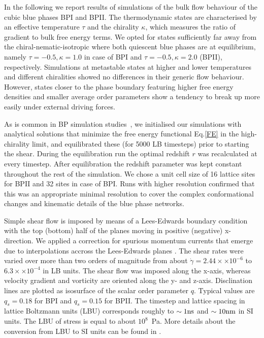\documentclass[aps,pre,reprint,superscriptaddress]{revtex4}
\newcommand{\e}[1]{\times10^{#1}}
\newcommand{\gd}{\dot{\gamma}}
\begin{document}
In the following we report results of simulations of the bulk flow behaviour of the cubic blue 
phases BPI and BPII. The thermodynamic states are characterised by an effective temperature 
$\tau$ and the chirality $\kappa$, which measures the ratio of gradient to bulk free energy terms.
We opted for states sufficiently far away from the chiral-nematic-isotropic 
where both quiescent blue phases are at equilibrium, namely
$\tau=-0.5, \kappa=1.0$ in case of BPI and $\tau=-0.5, \kappa=2.0$ (BPII), respectively.
Simulations at metastable states at higher and lower temperatures and different chiralities showed 
no differences in their generic flow behaviour.
However, states closer to the phase boundary featuring higher free energy densities and 
smaller average order parameters show a tendency to break up more easily under external driving forces.

As is common in BP simulation studies~\cite{Henrich:2011a,Henrich:2010b}, we initialised our simulations with 
analytical solutions that minimize the free energy functional Eq.\ref{FE} in the high-chirality limit, 
and equilibrated these (for 5000 LB timesteps) prior to starting the shear. 
During the equilibration run the optimal redshift $r$ was recalculated at every timestep.
After equilibration the redshift parameter was kept constant throughout the rest of the simulation.
We chose a unit cell size of 16 lattice sites for BPII and 32 sites in case of BPI. 
Runs with higher resolution confirmed that this was an appropriate minimal resolution to cover 
the complex conformational changes and kinematic details of the blue phase networks.

Simple shear flow is imposed by means of a Lees-Edwards boundary condition ~\cite{Wagner:2002} with
the top (bottom) half of the planes moving in positive (negative) x-direction.
We applied a correction for spurious momentum currents that emerge due to interpolations accross 
the Lees-Edwards planes \cite{Henrich:2012a}.
The shear rates were varied over more than two orders of magnitude from about 
$\gd=2.44\times \e{-6}$ to $6.3\times\e{-4}$ in LB units.
The shear flow was imposed along the x-axis, whereas velocity gradient and vorticity are oriented 
along the y- and z-axis.
Disclination lines are plotted as isosurface of the scalar order parameter $q$. Typical values 
are $q_s=0.18$ for BPI and $q_s=0.15$ for BPII.
The timestep and lattice spacing in lattice Boltzmann units (LBU) corresponds roughly to
$\sim 1 {\rm ns}$ and $\sim 10{\rm nm}$ in SI units. The LBU of stress
is equal to about $10^8$~Pa.
More details about the conversion from LBU to SI units can be found in
\cite{Henrich:2011a,Henrich:2010b}.
\end{document}
